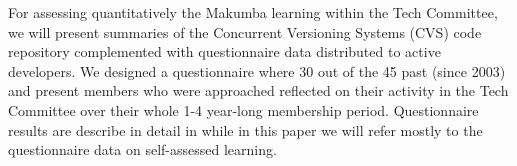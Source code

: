 \documentclass{llncs}
\begin{document}
For assessing quantitatively the Makumba learning within the Tech Committee, we will present summaries of the Concurrent Versioning Systems (CVS) code repository complemented with questionnaire data distributed to active developers. 
We designed a questionnaire where 30 out of the 45 past (since 2003) and present members who were approached reflected on their activity in the Tech Committee over their whole 1-4 year-long membership period. Questionnaire results are describe in detail in \cite{bogdan_mayer09} while in this paper we will refer mostly to the questionnaire data on self-assessed learning.

\end{document}
